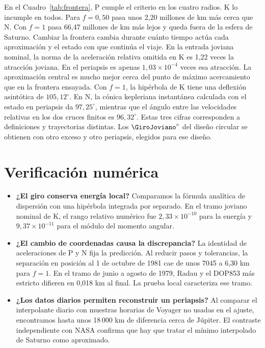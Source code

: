 \documentclass[11pt,letterpaper]{article}
\begin{document}
En el Cuadro~\ref{tab:frontera}, P cumple el criterio en los cuatro radios. K lo incumple en todos. Para $f=0{,}50$ pasa unos 2,20 millones de km más cerca que N. Con $f=1$ pasa 66,47 millones de km más lejos y queda fuera de la esfera de Saturno. Cambiar la frontera cambia durante cuánto tiempo actúa cada aproximación y el estado con que continúa el viaje. En la entrada joviana nominal, la norma de la aceleración relativa omitida en K es 1,22 veces la atracción joviana. En el periapsis es apenas $1{,}03\times10^{-4}$ veces esa atracción. La aproximación central es mucho mejor cerca del punto de máximo acercamiento que en la frontera ensayada. Con $f=1$, la hipérbola de K tiene una deflexión asintótica de $105{,}12^\circ$. En N, la cónica kepleriana instantánea calculada con el estado en periapsis da $97{,}25^\circ$, mientras que el ángulo entre las velocidades relativas en los dos cruces finitos es $96{,}32^\circ$. Estas tres cifras corresponden a definiciones y trayectorias distintas. Los $\GiroJoviano^\circ$ del diseño circular se obtienen con otro exceso y otro periapsis, elegidos para ese diseño.

\section{Verificación numérica}
\begin{itemize}
\item \textbf{¿El giro conserva energía local?} Comparamos la fórmula analítica de dispersión con una hipérbola integrada por separado. En el tramo joviano nominal de K, el rango relativo numérico fue $2{,}33\times10^{-10}$ para la energía y $9{,}37\times10^{-11}$ para el módulo del momento angular.
\item \textbf{¿El cambio de coordenadas causa la discrepancia?} La identidad de aceleraciones de P y N fija la predicción. Al reducir pasos y tolerancias, la separación en posición al 1 de octubre de 1981 cae de unos 7045 a 6,30 km para $f=1$. En el tramo de junio a agosto de 1979, Radau y el DOP853 más estricto difieren en 0,018 km al final. La prueba local caracteriza ese tramo.
\item \textbf{¿Los datos diarios permiten reconstruir un periapsis?} Al comparar el interpolante diario con muestras horarias de Voyager no usadas en el ajuste, encontramos hasta unos 18\,000 km de diferencia cerca de Júpiter. El contraste independiente con NASA confirma que hay que tratar el mínimo interpolado de Saturno como aproximado.
\end{itemize}
\end{document}
